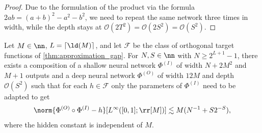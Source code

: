 \documentclass[twoside,11pt]{article}
\newcommand{\set}[1]{\ensuremath{\mathcal{#1}}}
\begin{document}
\begin{proof}
Due to the formulation of the product via the formula $2ab=(a+b)^2-a^2-b^2$, we need to repeat the same network three times in width, while the depth stays at $\mathcal{O}(2T^2)=\mathcal{O}(2S^2)=\mathcal{O}(S^2)$.
\end{proof}


\begin{theorem}
\label{thm:heaviside_joint}
    Let $M \in \nn$, $L = \lceil \ld(M) \rceil$, and let $\mathcal{F}$ be the class of orthogonal target functions of \cref{thm:approximation_gap}.
    For $N,S\in\nn$ with $N \geq 2^{L+1}-1$, there exists a composition of a shallow neural network $\Phi^{(I)}$ of width $N+2M^2$ and $M+1$ outputs and a deep neural network $\Phi^{(O)}$ of width $12M$ 
    and depth $\mathcal{O}(S^2)$ such that for each $h\in\set{F}$ only the parameters of $\Phi^{(I)}$ need to be adapted to get
    \begin{align}
        \norm{\Phi^{(O)}\circ \Phi^{(I)} - h}[L^\infty([0,1];\rr[M])]\lesssim M(N^{-1}+S2^{-S}),
    \end{align}
    where the hidden constant is independent of $M$.
\end{theorem}
\end{document}
